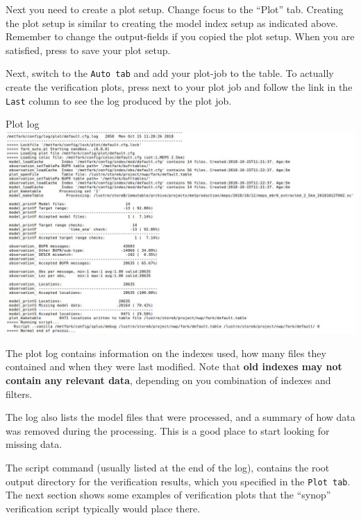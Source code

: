 \documentclass[letterpaper,10pt,twoside,twocolumn,openany]{book}
\begin{document}
{Next you need to create a plot setup. Change focus to the ``Plot'' tab. 
Creating the plot setup is similar to creating the model index setup as indicated above. Remember to change the output-fields if you copied the plot setup.
When you are satisfied, press  to save your plot setup.

Next, switch to the \lstinline!Auto tab! and add your plot-job to the table.
To actually create the verification plots, press  next to your plot job and follow the link in the \lstinline!Last! column to see the log produced by the plot job.
\begin{paperbox}{Plot log}
  \includegraphics[width=\columnwidth]{plotlog.jpg}
\end{paperbox}

The plot log contains information on the indexes used, how many files they contained and when they were last modified. Note that {\bf old indexes may not contain any relevant data}, depending on you combination of indexes and filters.

The log also lists the model files that were processed, and a summary of how data was removed during the processing. This is a good place to start looking for missing data.

The script command (usually listed at the end of the log), contains the root output directory for the verification results, which you specified in the \lstinline!Plot tab!. The next section shows some examples of verification plots that the ``synop'' verification script typically would place there.

}
\end{document}
